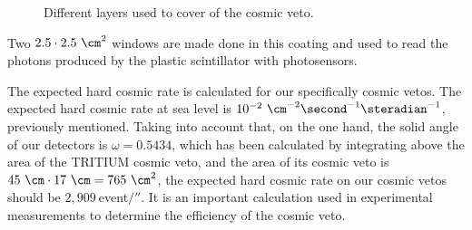 \begin{figure}[h]
 \centering
 \caption{Different layers used to cover of the cosmic veto.}
 \label{fig:LayersVeto}
\end{figure}

Two $2.5\cdot{} 2.5 ~\cm^2$ windows are made done in this coating and used to read the photons produced by the plastic scintillator with photosensors.

The expected hard cosmic rate is calculated for our specifically cosmic vetos. The expected hard cosmic rate at sea level is $10^{-2}~\cm^{-2}\second^{-1}\steradian^{-1}$, previously mentioned. Taking into account that, on the one hand, the solid angle of our detectors is $\omega=0.5434$, which has been calculated by integrating above the area of the TRITIUM cosmic veto, and the area of its cosmic veto is $45~\cm \cdot{} 17~\cm=765~\cm^2$, the expected hard cosmic rate on our cosmic vetos should be $2,909~$event$/\second$. It is an important calculation used in experimental measurements to determine the efficiency of the cosmic veto.
